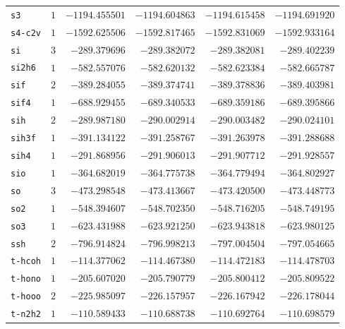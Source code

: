 {\begin{longtable}{@{}lrrrrr@{}}
    \texttt{s3} & $1$ & $-1194.455501$ & $-1194.604863$ & $-1194.615458$ & $-1194.691920$ \\
    \texttt{s4-c2v} & $1$ & $-1592.625506$ & $-1592.817465$ & $-1592.831069$ & $-1592.933164$ \\
    \texttt{si} & $3$ & $-289.379696$ & $-289.382072$ & $-289.382081$ & $-289.402239$ \\
    \texttt{si2h6} & $1$ & $-582.557076$ & $-582.620132$ & $-582.623384$ & $-582.665787$ \\
    \texttt{sif} & $2$ & $-389.284055$ & $-389.374741$ & $-389.378836$ & $-389.403981$ \\
    \texttt{sif4} & $1$ & $-688.929455$ & $-689.340533$ & $-689.359186$ & $-689.395866$ \\
    \texttt{sih} & $2$ & $-289.987180$ & $-290.002914$ & $-290.003482$ & $-290.024101$ \\
    \texttt{sih3f} & $1$ & $-391.134122$ & $-391.258767$ & $-391.263978$ & $-391.288688$ \\
    \texttt{sih4} & $1$ & $-291.868956$ & $-291.906013$ & $-291.907712$ & $-291.928557$ \\
    \texttt{sio} & $1$ & $-364.682019$ & $-364.775738$ & $-364.779494$ & $-364.802927$ \\
    \texttt{so} & $3$ & $-473.298548$ & $-473.413667$ & $-473.420500$ & $-473.448773$ \\
    \texttt{so2} & $1$ & $-548.394607$ & $-548.702350$ & $-548.716205$ & $-548.749195$ \\
    \texttt{so3} & $1$ & $-623.431988$ & $-623.921250$ & $-623.943818$ & $-623.980125$ \\
    \texttt{ssh} & $2$ & $-796.914824$ & $-796.998213$ & $-797.004504$ & $-797.054665$ \\
    \texttt{t-hcoh} & $1$ & $-114.377062$ & $-114.467380$ & $-114.472183$ & $-114.478703$ \\
    \texttt{t-hono} & $1$ & $-205.607020$ & $-205.790779$ & $-205.800412$ & $-205.809522$ \\
    \texttt{t-hooo} & $2$ & $-225.985097$ & $-226.157957$ & $-226.167942$ & $-226.178044$ \\
    \texttt{t-n2h2} & $1$ & $-110.589433$ & $-110.688738$ & $-110.692764$ & $-110.698579$ \\
\end{longtable}
}

